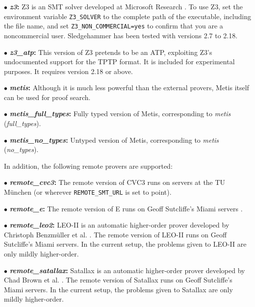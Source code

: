 \documentclass[a4paper,12pt]{article}
\begin{document}
\begin{enum}
\begin{enum}
\item[$\bullet$] \textbf{\textit{z3}:} Z3 is an SMT solver developed at
Microsoft Research \cite{z3}. To use Z3, set the environment variable
\texttt{Z3\_SOLVER} to the complete path of the executable, including the file
name, and set \texttt{Z3\_NON\_COMMERCIAL=yes} to confirm that you are a
noncommercial user. Sledgehammer has been tested with versions 2.7 to 2.18.

\item[$\bullet$] \textbf{\textit{z3\_atp}:} This version of Z3 pretends to be an
ATP, exploiting Z3's undocumented support for the TPTP format. It is included
for experimental purposes. It requires version 2.18 or above.

\item[$\bullet$] \textbf{\textit{metis}:} Although it is much less powerful than
the external provers, Metis itself can be used for proof search.

\item[$\bullet$] \textbf{\textit{metis\_full\_types}:} Fully typed version of
Metis, corresponding to \textit{metis} (\textit{full\_types}).

\item[$\bullet$] \textbf{\textit{metis\_no\_types}:} Untyped version of Metis,
corresponding to \textit{metis} (\textit{no\_types}).
\end{enum}

In addition, the following remote provers are supported:

\begin{enum}
\item[$\bullet$] \textbf{\textit{remote\_cvc3}:} The remote version of CVC3 runs
on servers at the TU M\"unchen (or wherever \texttt{REMOTE\_SMT\_URL} is set to
point).

\item[$\bullet$] \textbf{\textit{remote\_e}:} The remote version of E runs
on Geoff Sutcliffe's Miami servers \cite{sutcliffe-2000}.

\item[$\bullet$] \textbf{\textit{remote\_leo2}:} LEO-II is an automatic
higher-order prover developed by Christoph Benzm\"uller et al. \cite{leo2}. The
remote version of LEO-II runs on Geoff Sutcliffe's Miami servers. In the current
setup, the problems given to LEO-II are only mildly higher-order.

\item[$\bullet$] \textbf{\textit{remote\_satallax}:} Satallax is an automatic
higher-order prover developed by Chad Brown et al. \cite{satallax}. The remote
version of Satallax runs on Geoff Sutcliffe's Miami servers. In the current
setup, the problems given to Satallax are only mildly higher-order.


\end{enum}
\end{enum}
\end{document}
